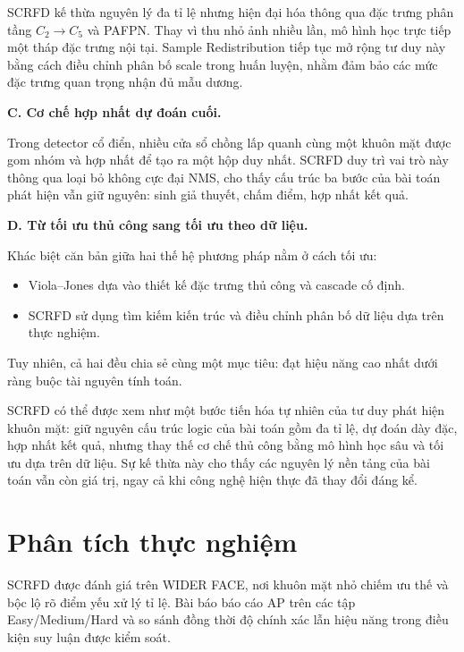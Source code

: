 SCRFD kế thừa nguyên lý đa tỉ lệ nhưng hiện đại hóa thông qua đặc trưng phân tầng $C_2 \rightarrow C_5$ và PAFPN. 
Thay vì thu nhỏ ảnh nhiều lần, mô hình học trực tiếp một tháp đặc trưng nội tại. 
Sample Redistribution tiếp tục mở rộng tư duy này bằng cách điều chỉnh phân bố scale trong huấn luyện, nhằm đảm bảo các mức đặc trưng quan trọng nhận đủ mẫu dương.

\medskip
\noindent\textbf{C. Cơ chế hợp nhất dự đoán cuối.}

Trong detector cổ điển, nhiều cửa sổ chồng lấp quanh cùng một khuôn mặt được gom nhóm và hợp nhất để tạo ra một hộp duy nhất. 
SCRFD duy trì vai trò này thông qua loại bỏ không cực đại NMS, cho thấy cấu trúc ba bước của bài toán phát hiện vẫn giữ nguyên: sinh giả thuyết, chấm điểm, hợp nhất kết quả.

\medskip
\noindent\textbf{D. Từ tối ưu thủ công sang tối ưu theo dữ liệu.}

Khác biệt căn bản giữa hai thế hệ phương pháp nằm ở cách tối ưu:

\begin{itemize}
  \item Viola--Jones dựa vào thiết kế đặc trưng thủ công và cascade cố định.
  \item SCRFD sử dụng tìm kiếm kiến trúc và điều chỉnh phân bố dữ liệu dựa trên thực nghiệm.
\end{itemize}

Tuy nhiên, cả hai đều chia sẻ cùng một mục tiêu: đạt hiệu năng cao nhất dưới ràng buộc tài nguyên tính toán.

\medskip
\noindent
SCRFD có thể được xem như một bước tiến hóa tự nhiên của tư duy phát hiện khuôn mặt: giữ nguyên cấu trúc logic của bài toán gồm đa tỉ lệ, dự đoán dày đặc, hợp nhất kết quả, nhưng thay thế cơ chế thủ công bằng mô hình học sâu và tối ưu dựa trên dữ liệu.
Sự kế thừa này cho thấy các nguyên lý nền tảng của bài toán vẫn còn giá trị, ngay cả khi công nghệ hiện thực đã thay đổi đáng kể.

\section{Phân tích thực nghiệm}

SCRFD được đánh giá trên WIDER FACE, nơi khuôn mặt nhỏ chiếm ưu thế và bộc lộ rõ điểm yếu xử lý tỉ lệ.
Bài báo báo cáo AP trên các tập Easy/Medium/Hard và so sánh đồng thời độ chính xác lẫn hiệu năng
trong điều kiện suy luận được kiểm soát.  \cite{guo2022scrfd,yang2016widerface}

